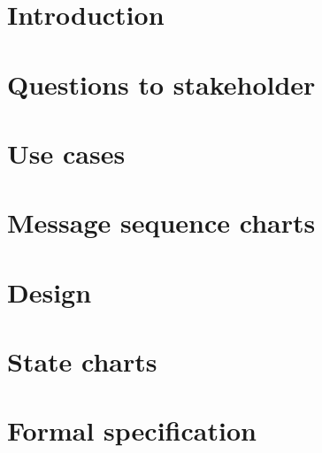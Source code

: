 \documentclass[a4paper,11pt]{article}
\begin{document}
	
	
	\tableofcontents
	\newpage
	
	\section{Introduction}
	
	\newpage

	\section{Questions to stakeholder}
	
	\newpage
	
	\section{Use cases}
	
	\newpage

	\section{Message sequence charts}
	
	\newpage

	\section{Design}
	
	\newpage

	\section{State charts}
	
	\newpage

	\section{Formal specification}
	
	\newpage
\end{document}
